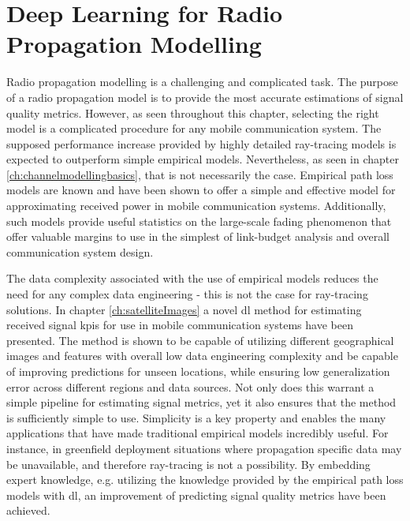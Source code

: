 \chapter{Deep Learning for Radio Propagation Modelling}\label{ch:dl_radio_summary}
Radio propagation modelling is a challenging and complicated task. The purpose of a radio propagation model is to provide the most accurate estimations of signal quality metrics. However, as seen throughout this chapter, selecting the right model is a complicated procedure for any mobile communication system. The supposed performance increase provided by highly detailed ray-tracing models is expected to outperform simple empirical models. Nevertheless, as seen in chapter \ref{ch:channelmodellingbasics}, that is not necessarily the case. Empirical path loss models are known and have been shown to offer a simple and effective model for approximating received power in mobile communication systems. Additionally, such models provide useful statistics on the large-scale fading phenomenon that offer valuable margins to use in the simplest of link-budget analysis and overall communication system design. 

The data complexity associated with the use of empirical models reduces the need for any complex data engineering - this is not the case for ray-tracing solutions. In chapter \ref{ch:satelliteImages} a novel \gls{dl} method for estimating received signal \glspl{kpi} for use in mobile communication systems have been presented. The method is shown to be capable of utilizing different geographical images and features with overall low data engineering complexity and be capable of improving predictions for unseen locations, while ensuring low generalization error across different regions and data sources. Not only does this warrant a simple pipeline for estimating signal metrics, yet it also ensures that the method is sufficiently simple to use. Simplicity is a key property and enables the many applications that have made traditional empirical models incredibly useful. For instance, in greenfield deployment situations where propagation specific data may be unavailable, and therefore ray-tracing is not a possibility. By embedding expert knowledge, e.g. utilizing the knowledge provided by the empirical path loss models with \gls{dl}, an improvement of predicting signal quality metrics have been achieved.


